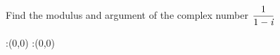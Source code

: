 
 \setcounter{rolldice}{1}


\question Find the modulus and argument of the complex number $\dfrac{1}{1-\textit{i}}$


\watchout

\ifprintanswers
  \begin{marginfigure}
      :(0,0)
      :(0,0)
    \figdrawbegin{}
      \figdrawline [100,101]
    \figdrawend
    \figvisu{\figBoxA}{}{%
    }
    \centerline{\box\figBoxA}
  \end{marginfigure}
\fi 

